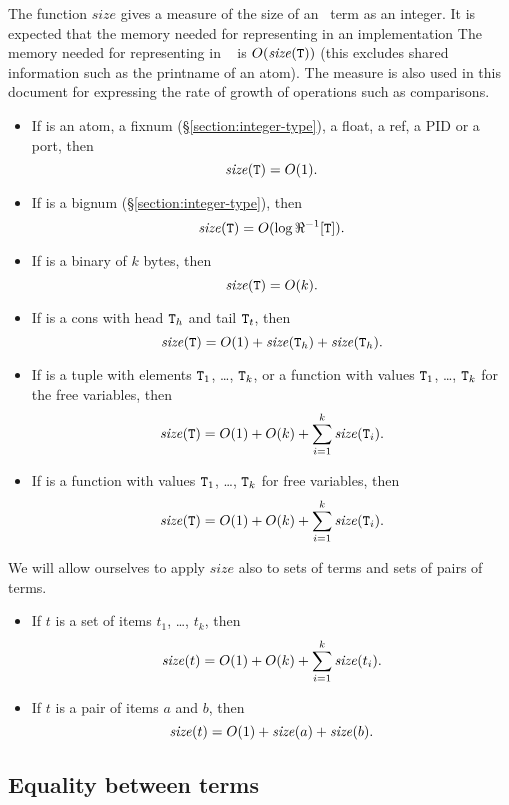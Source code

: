 The function $\mathit{size}$
gives a measure of the size of an \Erlang\ term  as
an integer.
\ifStd
It is expected that the memory needed for representing  in
an implementation
\fi
\ifOld
The memory needed for representing  in \OldErlang\
\fi
is $O(\mathit{size}({\tt{\sl T}}))$ (this excludes shared information
such as the printname of an atom).
The measure is also used in this document
for expressing the rate of growth of operations such
as comparisons.
\begin{itemize}
\item If  is an atom, a fixnum (\S\ref{section:integer-type}),
a float, a ref, a PID or a port, then
\[\I{size}() = O(1).\]
\item If \TZ{T} is a bignum (\S\ref{section:integer-type}), then
\[\I{size}() = O(\log \Er[\TZ{T}]).\]
\item If \TZ{T} is a binary of $k$ bytes, then
\[\I{size}() = O(k).\]
\item If \TZ{T} is a cons with head ${\tt{\sl T}}_h$ and tail ${\tt{\sl T}}_t$, then
\[\I{size}() = O(1)+\mathit{size}(\TZ{T}_h)+\mathit{size}(\TZ{T}_h).\]
\item If \TZ{T} is a tuple with elements ${\tt{\sl T}}_1$, \ldots, ${\tt{\sl T}}_k$, or
a function with values ${\tt{\sl T}}_1$, \ldots, ${\tt{\sl T}}_k$
for the free variables, then
\[\I{size}() = O(1)+O(k)+\sum_{i=1}^k\mathit{size}(\TZ{T}_i).\]
\item If \TZ{T} is a function with values ${\tt{\sl T}}_1$, \ldots, ${\tt{\sl T}}_k$
for free variables, then
\[{\it size}({\tt{\sl T}}) = O(1)+O(k)+\sum_{i=1}^k\mathit{size}({\tt{\sl T}}_i).\]
\end{itemize}
We will allow ourselves to apply $\mathit{size}$ also to sets of terms
and sets of pairs of terms.
\begin{itemize}
\item If $t$ is a set of items $t_1$, \ldots, $t_k$, then
\[{\it size}(t) = O(1)+O(k)+\sum_{i=1}^k\mathit{size}(t_i).\]
\item If $t$ is a pair of items $a$ and $b$, then
\[{\it size}(t) = O(1)+\mathit{size}(a)+\mathit{size}(b).\]
\end{itemize}

\subsection{Equality between terms}

\label{section:equality}

